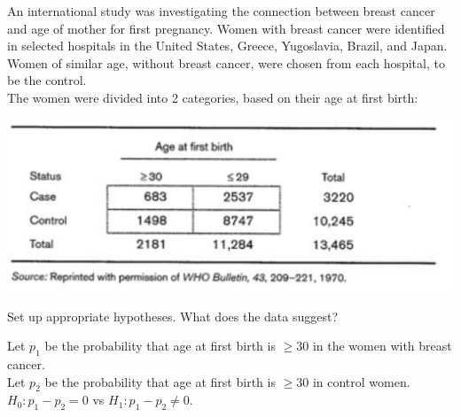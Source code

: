 \documentclass[bigtut]{tutorial}\usepackage[]{graphicx}\usepackage[]{color}
\begin{document}
\begin{tutorial}
\begin{questions}
\begin{solution}
\end{solution}

\question
An international study was investigating the connection between breast cancer and age of mother for first pregnancy. Women with breast cancer were identified in selected hospitals in the United States, Greece, Yugoslavia, Brazil, and Japan. Women of similar age, without breast cancer, were chosen from each hospital, to be the control. \\

The women were divided into 2 categories, based on their age at first birth:

\includegraphics[scale=0.5]{DataBreastCancer.jpg}

Set up appropriate hypotheses. What does the data suggest?

\begin{solution} 

Let $p_{1}$ be the probability that age at first birth is $ \geq 30$
in the women with breast cancer. \\
Let $p_{2}$ be the probability that age at first birth is $\geq
30$ in control women. \\

$H_{0}: p_{1} - p_{2} = 0$ vs $H_{1}: p_{1} - p_{2} \neq 0$.

\end{solution}



\end{questions}
\end{tutorial}
\end{document}
